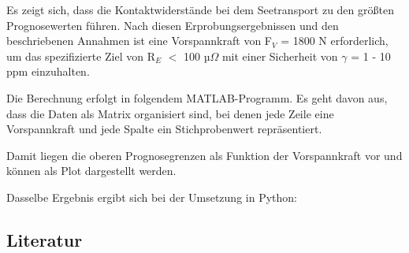 \noindent Es zeigt sich, dass die Kontaktwiderst\"{a}nde bei dem Seetransport zu den gr\"{o}{\ss}ten Prognosewerten f\"{u}hren. Nach diesen Erprobungsergebnissen und den beschriebenen Annahmen ist eine Vorspannkraft von F$_{V}$ = 1800 N erforderlich, um das spezifizierte Ziel von R$_{E}$ $\mathrm{<}$ 100 µ$\Omega$ mit einer Sicherheit von $\gamma$ = 1 - 10 ppm einzuhalten.\newline

\noindent Die Berechnung erfolgt in folgendem MATLAB-Programm. Es geht davon aus, dass die Daten als Matrix organisiert sind, bei denen jede Zeile eine Vorspannkraft und jede Spalte ein Stichprobenwert repr\"{a}sentiert.



\noindent Damit liegen die oberen Prognosegrenzen als Funktion der Vorspannkraft vor und k\"{o}nnen als Plot dargestellt werden.



\clearpage

\noindent Dasselbe Ergebnis ergibt sich bei der Umsetzung in Python:



\clearpage

\subsection{Literatur}

